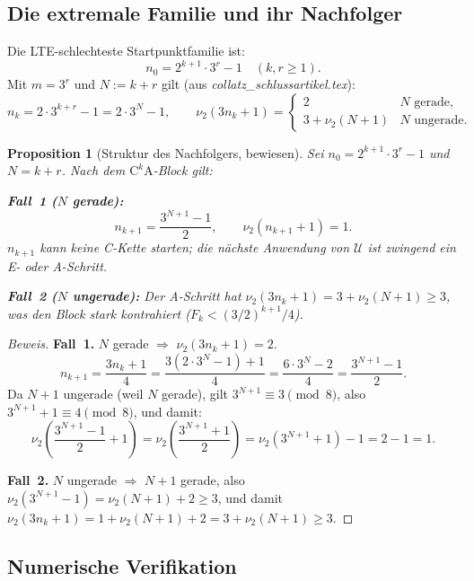\documentclass[12pt,a4paper]{article}
\newtheorem{proposition}[definition]{Proposition}
\newenvironment{beweis}{\begin{proof}[Beweis]}{\end{proof}}
\newcommand{\vii}{\nu_2}
\newcommand{\U}{\mathcal{U}}
\begin{document}
\subsection{Die extremale Familie und ihr Nachfolger}

Die LTE-schlechteste Startpunktfamilie ist:
\[
  n_0 = 2^{k+1}\cdot 3^r - 1
  \quad (k,r \geq 1).
\]
Mit $m = 3^r$ und $N := k+r$ gilt (aus \textit{collatz\_schlussartikel.tex}):
\[
  n_k = 2\cdot 3^{k+r} - 1 = 2\cdot 3^N - 1,
  \qquad
  \vii(3n_k+1) =
  \begin{cases}
    2 & N \text{ gerade,}\\
    3+\vii(N+1) & N \text{ ungerade.}
  \end{cases}
\]

\begin{proposition}[Struktur des Nachfolgers, bewiesen]
\label{prop:nachfolger}
Sei $n_0 = 2^{k+1}\cdot 3^r - 1$ und $N = k+r$. Nach dem
$\mathrm{C}^k\mathrm{A}$-Block gilt:

\noindent\textbf{Fall~1 ($N$ gerade):}
\[
  n_{k+1} = \frac{3^{N+1}-1}{2}, \qquad \vii(n_{k+1}+1) = 1.
\]
$n_{k+1}$ kann keine C-Kette starten; die nächste Anwendung von
$\U$ ist zwingend ein E- oder A-Schritt.

\noindent\textbf{Fall~2 ($N$ ungerade):}
Der A-Schritt hat $\vii(3n_k+1) = 3 + \vii(N+1) \geq 3$,
was den Block stark kontrahiert ($F_k < (3/2)^{k+1}/4$).
\end{proposition}

\begin{beweis}
\textbf{Fall~1.} $N$ gerade $\Rightarrow$ $\vii(3n_k+1) = 2$.
\[
  n_{k+1} = \frac{3n_k+1}{4} = \frac{3(2\cdot 3^N-1)+1}{4}
  = \frac{6\cdot 3^N - 2}{4} = \frac{3^{N+1}-1}{2}.
\]
Da $N+1$ ungerade (weil $N$ gerade), gilt $3^{N+1} \equiv 3 \pmod 8$,
also $3^{N+1}+1 \equiv 4 \pmod 8$, und damit:
\[
  \vii\!\left(\frac{3^{N+1}-1}{2}+1\right)
  = \vii\!\left(\frac{3^{N+1}+1}{2}\right)
  = \vii(3^{N+1}+1)-1 = 2-1 = 1.
\]

\textbf{Fall~2.} $N$ ungerade $\Rightarrow$ $N+1$ gerade, also
$\vii(3^{N+1}-1) = \vii(N+1)+2 \geq 3$, und damit
$\vii(3n_k+1) = 1+\vii(N+1)+2 = 3+\vii(N+1) \geq 3$.
\end{beweis}

\subsection{Numerische Verifikation}
\end{document}

